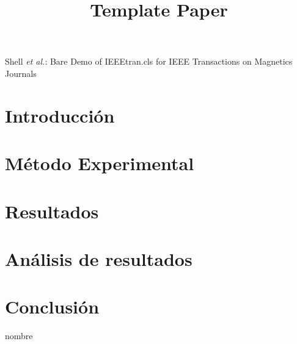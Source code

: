 \documentclass[journal,transmag]{IEEEtran}
\begin{document}
\title{Template Paper}




\author{}


%
{Shell \MakeLowercase{\textit{et al.}}: Bare Demo of IEEEtran.cls for IEEE Transactions on Magnetics Journals}

    \maketitle
    
    
\section{Introducción}\label{ch:introduccion}

 
\section{Método Experimental}

\section{Resultados}

\section{Análisis de resultados}

\section{Conclusión}

\begin{thebibliography}{X}
     nombre 
\end{thebibliography}
\end{document}
